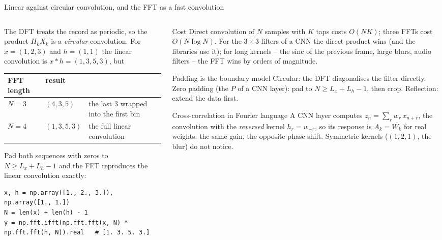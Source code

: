 \documentclass[10pt,aspectratio=169]{beamer}
\begin{document}
\begin{frame}[fragile]{Linear against circular convolution, and the FFT as a fast convolution}
\scriptsize
\lstset{basicstyle=\ttfamily\tiny}
\begin{columns}[T]
\begin{column}{0.5\textwidth}
The DFT treats the record as periodic, so the product $H_kX_k$ is a
\emph{circular} convolution.  For $x=(1,2,3)$ and $h=(1,1)$ the linear
convolution is $x*h=(1,3,5,3)$, but
\begin{center}
\begin{tabular}{@{}lll@{}}
\toprule
FFT length & result & \\
\midrule
$N=3$ & $(4,3,5)$ & the last $3$ wrapped into the first bin\\
$N=4$ & $(1,3,5,3)$ & the full linear convolution\\
\bottomrule
\end{tabular}
\end{center}
Pad both sequences with zeros to $N\ge L_x+L_h-1$ and the FFT reproduces
the linear convolution exactly:
\begin{lstlisting}
x, h = np.array([1., 2., 3.]), np.array([1., 1.])
N = len(x) + len(h) - 1
y = np.fft.ifft(np.fft.fft(x, N) * np.fft.fft(h, N)).real   # [1. 3. 5. 3.]
\end{lstlisting}
\end{column}
\begin{column}{0.48\textwidth}
\begin{block}{Cost}
Direct convolution of $N$ samples with $K$ taps costs $O(NK)$; three FFTs
cost $O(N\log N)$.  For the $3\times3$ filters of a CNN the direct product
wins (and the libraries use it); for long kernels -- the sinc of the
previous frame, large blurs, audio filters -- the FFT wins by orders of
magnitude.
\end{block}
\begin{block}{Padding is the boundary model}
Circular: the DFT diagonalises the filter directly.  Zero padding (the $P$
of a CNN layer): pad to $N\ge L_x+L_h-1$, then crop.  Reflection: extend
the data first.
\end{block}
\begin{block}{Cross-correlation in Fourier language}
A CNN layer computes $z_n=\sum_rw_r\,x_{n+r}$, the convolution with the
\emph{reversed} kernel $h_r=w_{-r}$, so its response is
$A_k=\overline{W_k}$ for real weights: the same gain, the opposite phase
shift.  Symmetric kernels ($(1,2,1)$, the blur) do not notice.
\end{block}
\end{column}
\end{columns}
\end{frame}
\end{document}
